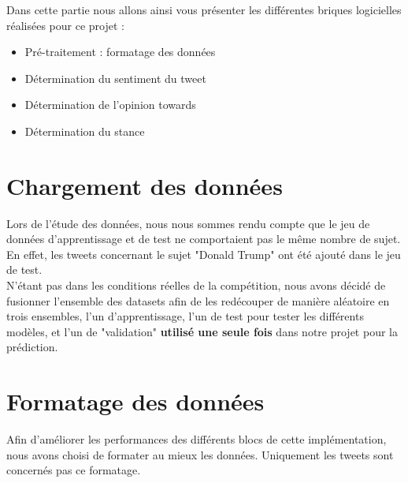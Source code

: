\par Dans cette partie nous allons ainsi vous présenter les  différentes briques logicielles réalisées pour ce projet : \\

\begin{itemize}
	\item Pré-traitement : formatage des données
	\item Détermination du sentiment du tweet
	\item Détermination de l'opinion towards 
	\item Détermination du stance \\
\end{itemize}

\section{Chargement des données}

Lors de l'étude des données, nous nous sommes rendu compte que le jeu de données d'apprentissage et de test ne comportaient pas le même nombre de sujet. En effet, les tweets concernant le sujet "Donald Trump" ont été ajouté dans le jeu de test. \\

N'étant pas dans les conditions réelles de la compétition, nous avons décidé de fusionner l'ensemble des datasets afin de les redécouper de manière aléatoire en trois ensembles, l'un d'apprentissage, l'un de test pour tester les différents modèles, et l'un de "validation" \textbf{utilisé une seule fois} dans notre projet pour la prédiction.


\section{Formatage des données}
\par Afin d'améliorer les performances des différents blocs de cette implémentation, nous avons choisi de formater au mieux les données. Uniquement les tweets sont concernés pas ce formatage. \\


